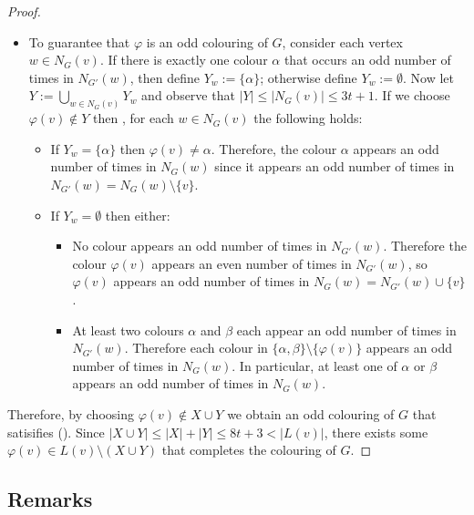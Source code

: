 \documentclass{patmorin}
\begin{document}
\begin{proof}
\begin{itemize}
    \item To guarantee that $\varphi$ is an odd colouring of $G$, consider each vertex $w\in N_{G}(v)$.  If there is exactly one colour $\alpha$ that occurs an odd number of times in $N_{G'}(w)$, then define $Y_{w} := \{\alpha\}$; otherwise define $Y_{w}:=\emptyset$. Now let $Y:=\bigcup_{w\in N_{G}(v)} Y_{w}$ and observe that $|Y|\le |N_G(v)|\le 3t+1$.
    If we choose $\varphi(v)\not\in Y$ then , for each $w\in N_{G}(v)$ the following holds:
    \begin{itemize}
      \item If $Y_{w}=\{\alpha\}$ then $\varphi(v)\neq\alpha$. Therefore, the colour $\alpha$ appears an odd number of times in $N_{G}(w)$ since it appears an odd number of times in $N_{G'}(w)=N_G(w)\setminus\{v\}$.
      \item If $Y_{w}=\emptyset$ then either:
      \begin{itemize}
        \item No colour appears an odd number of times in $N_{G'}(w)$.  Therefore the colour $\varphi(v)$ appears an even number of times in $N_{G'}(w)$, so $\varphi(v)$ appears an odd number of times in $N_G(w)=N_{G'}(w)\cup\{v\}$.
        \item At least two colours $\alpha$ and $\beta$ each appear an odd number of times in $N_{G'}(w)$.  Therefore each colour in $\{\alpha,\beta\}\setminus\{\varphi(v)\}$ appears an odd number of times in $N_{G}(w)$.  In particular, at least one of $\alpha$ or $\beta$ appears an odd number of times in $N_G(w)$.
      \end{itemize}
    \end{itemize}
  \end{itemize}
  Therefore, by choosing $\varphi(v)\not\in X\cup Y$ we obtain an odd colouring of $G$ that satisifies ().  Since $|X\cup Y|\le |X|+|Y|\le 8t+3 < |L(v)|$, there exists some $\varphi(v)\in L(v)\setminus(X\cup Y)$ that completes the colouring of $G$.
\end{proof}


\subsection{Remarks}

%
\end{document}
